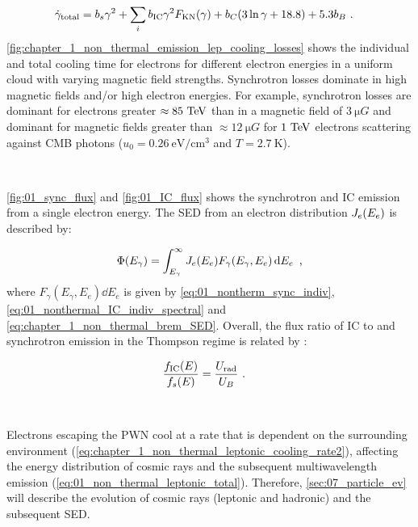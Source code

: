 \begin{equation}
    \begin{aligned}
    \dot{\gamma}_\text{total}&=b_s\gamma^2+\sum_{i} b_\text{IC}\gamma^2F_\text{KN}\qty(\gamma)+b_C\qty(3\ln \gamma+18.8)+5.3b_B \text{ .}
    \end{aligned} \label{eq:chapter_1_non_thermal_leptonic_cooling_rate2}
\end{equation}
\noindent \autoref{fig:chapter_1_non_thermal_emission_lep_cooling_losses} shows the individual and total cooling time for electrons for different electron energies in a uniform cloud with varying magnetic field strengths. Synchrotron losses dominate in high magnetic fields and/or high electron energies. For example, synchrotron losses are dominant for electrons greater $\approx 85~\TeV$ than in a magnetic field of $3~\si{\micro G}$ and dominant for magnetic fields greater than $\approx 12~\si{\micro G}$ for $1~\TeV$ electrons scattering against CMB photons ($u_0=0.26~\si{\electronvolt\per\centi\meter\cubed}$ and $T=2.7~\si{\kelvin}$). 
\par~\par 
\autoref{fig:01_sync_flux} and \autoref{fig:01_IC_flux} shows the synchrotron and IC emission from a single electron energy. The SED from an electron distribution $J_e\qty(E_e)$ is described by:

\begin{equation}
    \begin{aligned}
        \Phi\qty(E_\gamma)= \int_{E_\gamma}^\infty J_e\qty(E_e) F_\gamma(E_\gamma,E_e)\dd{E_e}\text{ ,}
    \end{aligned} \label{eq:01_non_thermal_leptonic_total}
\end{equation}
\noindent where $F_\gamma(E_\gamma,E_e)\dd{E_e}$ is given by \autoref{eq:01_nontherm_sync_indiv}, \autoref{eq:01_nonthermal_IC_indiv_spectral} and \autoref{eq:chapter_1_non_thermal_brem_SED}. Overall, the flux ratio of IC to and synchrotron emission in the Thompson regime is related by \citep{1997MNRAS.291..162A}:

\begin{equation}
    \begin{aligned}
    \frac{f_\text{IC}\qty(E)}{f_s\qty(E)}&=\frac{U_\text{rad}}{U_B}\text{ .}
    \end{aligned} \label{eq:chapter_IC_2_sync_ratio}
\end{equation}
\par~\par
Electrons escaping the PWN cool at a rate that is dependent on the surrounding environment (\autoref{eq:chapter_1_non_thermal_leptonic_cooling_rate2}), affecting the energy distribution of cosmic rays and the subsequent multiwavelength emission (\autoref{eq:01_non_thermal_leptonic_total}). Therefore, \autoref{sec:07_particle_ev} will describe the evolution of cosmic rays (leptonic and hadronic) and the subsequent SED.
